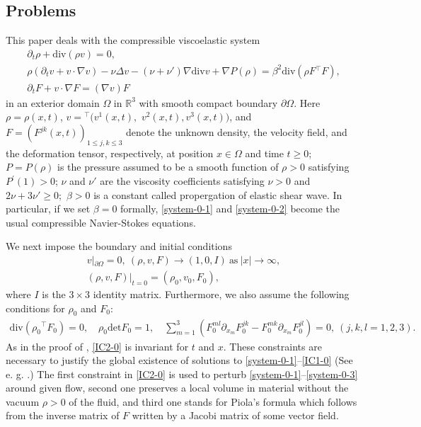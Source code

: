 \documentclass[dvipdfmx,12pt]{article}
\begin{document}
\subsection{Problems}
This paper deals with the compressible viscoelastic system   
\begin{gather}
\partial_t\rho+\mathrm{div} (\rho v)=0, \label{system-0-1} \\
\rho(\partial_t v+ v\cdot\nabla v)
-\nu{\Delta}v -(\nu+\nu')\nabla \mathrm{div} v
+\nabla  P(\rho)  = \beta^2\mathrm{div}(\rho F{}^\top\! F), \label{system-0-2} \\
\partial_t F + v\cdot\nabla F =(\nabla v)F \label{system-0-3}
\end{gather}
in an exterior domain $\Omega$ in $\mathbb{R}^3$ with smooth compact boundary $\partial \Omega$.
Here $\rho=\rho(x,t)$, 
$v ={}^\top (v^1(x,t),$ $ v^2(x,t), v^3(x,t))$, and $F=(F^{jk}(x,t))_{1\leq j,k\leq 3}$ denote
 the unknown density, the velocity field, and the deformation tensor, respectively, at  position $x\in \Omega$ and time $t\geq 0$;
$P=P(\rho) $ is the pressure assumed to be a smooth function of $\rho>0$ satisfying $P^\prime(1)>0$; $\nu$ and $\nu'$ are the viscosity coefficients satisfying $\nu>0$ and $2\nu+3\nu'\geq0;$
$\beta>0$ is a constant called propergation of elastic shear wave. In particular, if we set $\beta=0$ formally, \eqref{system-0-1} and \eqref{system-0-2} become the usual compressible Navier-Stokes equations.  

We next impose the boundary and initial conditions 
\begin{gather} 
v|_{\partial \Omega} =0,~(\rho, v, F)\to(1,0,I)~\textrm{as}~|x|\to \infty, \label{BC-0} \\
(\rho, v, F)|_{t=0}=(\rho_0,v_0,F_0), \label{IC1-0}
\end{gather}
where $I$ is the $3\times3$ identity matrix.
Furthermore, we also assume the following conditions for $\rho_0$ and $F_0$:
\begin{align}
\mathrm{div}(\rho_0 {}^\top\! F_0)=0, \quad
\rho_0\mathrm{det}F_0=1, \quad
\sum_{m=1}^3(F_0^{ml}\partial_{x_m}F_0^{jk}-F_0^{mk}\partial_{x_m}F_0^{jl})=0,
~(j,k,l=1,2,3). 
\label{IC2-0}
\end{align}
As in the proof of \cite[Proposition.1]{QZ10}, \eqref{IC2-0} is invariant for $t$ and $x$.
These constraints are necessary to justify the global existence of solutions to \eqref{system-0-1}--\eqref{IC1-0} (See e. g. \cite{CW18, HW11, Q11}.) The first constraint in \eqref{IC2-0} is used to perturb \eqref{system-0-1}--\eqref{system-0-3} around given flow, second one preserves a local volume in material without the vacuum $\rho>0$ of the fluid, and third one stands for Piola's formula which follows from the inverse matrix of $F$ written by a Jacobi matrix of some vector field.
\end{document}
